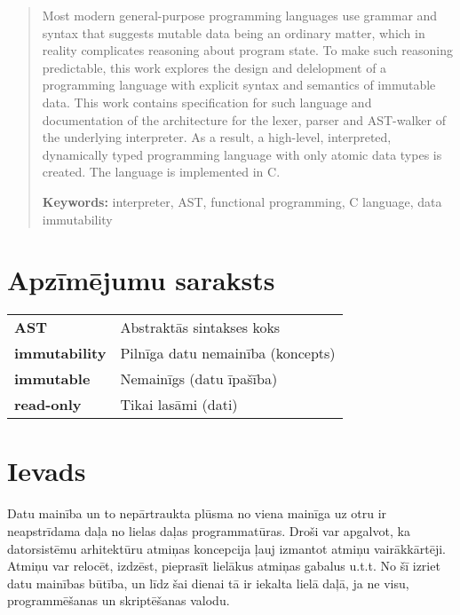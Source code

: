 \documentclass[12pt,a4paper]{report}
\begin{document}
\begin{abstract}
    Most modern general-purpose programming languages use grammar and syntax that suggests mutable data being an ordinary matter, which in reality complicates reasoning about program state.
    To make such reasoning predictable, this work explores the design and delelopment of a programming language with explicit syntax and semantics of immutable data. 
    This work contains specification for such language and documentation of the architecture for the lexer, parser and AST-walker of the underlying interpreter.
    As a result, a high-level, interpreted, dynamically typed programming language with only atomic data types is created. The language is implemented in C.

    \begin{flushleft}
    \textbf{Keywords:} interpreter, AST, functional programming, C language, data immutability
    \end{flushleft}
\end{abstract} 

\tableofcontents

\newpage
\chapter*{Apzīmējumu saraksts}


\begin{tabular}{ll} 
\textbf{AST} & Abstraktās sintakses koks \\
\textbf{immutability} & Pilnīga datu nemainība (koncepts) \\
\textbf{immutable} & Nemainīgs (datu īpašība) \\
\textbf{read-only} & Tikai lasāmi (dati)
\end{tabular}


\newpage
\chapter*{Ievads}

Datu mainība un to nepārtraukta plūsma no viena mainīga uz otru ir neapstrīdama daļa no lielas daļas programmatūras. Droši var apgalvot, ka datorsistēmu arhitektūru atmiņas koncepcija ļauj izmantot atmiņu vairākkārtēji. Atmiņu var relocēt, izdzēst, pieprasīt lielākus atmiņas gabalus u.t.t. No šī izriet datu mainības būtība, un līdz šai dienai tā ir iekalta lielā daļā, ja ne visu, programmēšanas un skriptēšanas valodu.   
\end{document}
